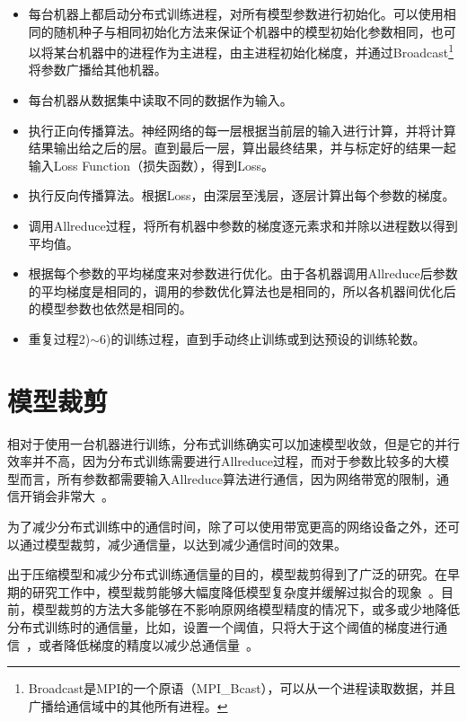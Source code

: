 \begin{itemize}
    \item [1)]
    每台机器上都启动分布式训练进程，对所有模型参数进行初始化。可以使用相同的随机种子与相同初始化方法来保证个机器中的模型初始化参数相同，也可以将某台机器中的进程作为主进程，由主进程初始化梯度，并通过Broadcast\footnote{Broadcast是MPI的一个原语（MPI\_Bcast），可以从一个进程读取数据，并且广播给通信域中的其他所有进程。}将参数广播给其他机器。
    \item [2)]
    每台机器从数据集中读取不同的数据作为输入。
    \item [3)]
    执行正向传播算法。神经网络的每一层根据当前层的输入进行计算，并将计算结果输出给之后的层。直到最后一层，算出最终结果，并与标定好的结果一起输入Loss Function（损失函数），得到Loss。
    \item [4)]
    执行反向传播算法。根据Loss，由深层至浅层，逐层计算出每个参数的梯度。
    \item [5)]
    调用Allreduce过程，将所有机器中参数的梯度逐元素求和并除以进程数以得到平均值。
    \item [6)]
    根据每个参数的平均梯度来对参数进行优化。由于各机器调用Allreduce后参数的平均梯度是相同的，调用的参数优化算法也是相同的，所以各机器间优化后的模型参数也依然是相同的。
    \item [7)]
    重复过程2)$\sim$6)的训练过程，直到手动终止训练或到达预设的训练轮数。
\end{itemize}

\section{模型裁剪}

相对于使用一台机器进行训练，分布式训练确实可以加速模型收敛，但是它的并行效率并不高，因为分布式训练需要进行Allreduce过程，而对于参数比较多的大模型而言，所有参数都需要输入Allreduce算法进行通信，因为网络带宽的限制，通信开销会非常大~\cite{li2014communication, wen2017terngrad}。

为了减少分布式训练中的通信时间，除了可以使用带宽更高的网络设备之外，还可以通过模型裁剪，减少通信量，以达到减少通信时间的效果。

出于压缩模型和减少分布式训练通信量的目的，模型裁剪得到了广泛的研究。在早期的研究工作中，模型裁剪能够大幅度降低模型复杂度并缓解过拟合的现象~\cite{lecun1990optimal, hanson1989comparing, hassibi1993second}。目前，模型裁剪的方法大多能够在不影响原网络模型精度的情况下，或多或少地降低分布式训练时的通信量，比如，设置一个阈值，只将大于这个阈值的梯度进行通信~\cite{strom2015scalable}，或者降低梯度的精度以减少总通信量~\cite{seide20141}。


